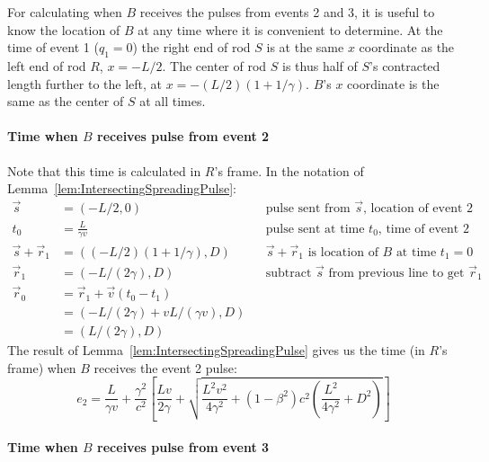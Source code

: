 \documentclass[a4paper]{article}
\theoremstyle{plain}
\theoremstyle{definition}
\newcommand{\vect}[1]{\vec{#1}}
\begin{document}

For calculating when $B$ receives the pulses from events 2 and 3, it
is useful to know the location of $B$ at any time where it is
convenient to determine.  At the time of event 1 ($q_1=0$) the right
end of rod $S$ is at the same $x$ coordinate as the left end of rod
$R$, $x=-L/2$.  The center of rod $S$ is thus half of $S$'s contracted
length further to the left, at $x=-(L/2)(1+1/\gamma)$.  $B$'s $x$
coordinate is the same as the center of $S$ at all times.

\paragraph{Time when $B$ receives pulse from event 2}

Note that this time is calculated in $R$'s frame.
In the notation of Lemma~\ref{lem:IntersectingSpreadingPulse}:
\begin{align*}
\vect{s} & = (-L/2, 0) & & \text{pulse sent from $\vect{s}$, location of event 2} \\
t_0 & = \frac{L}{\gamma v} & & \text{pulse sent at time $t_0$, time of event 2} \\
\vect{s} + \vect{r}_1 & = ((-L/2)(1+1/\gamma), D) & & \text{$\vect{s}+\vect{r}_1$ is location of $B$ at time $t_1=0$} \\
\vect{r}_1 & = (-L/(2 \gamma), D) & & \text{subtract $\vect{s}$ from previous line to get $\vect{r}_1$} \\
\vect{r}_0 & = \vect{r}_1 + \vect{v}(t_0-t_1) \\
           & = (-L/(2 \gamma) + vL/(\gamma v), D) \\
           & = (L/(2 \gamma), D)
\end{align*}
The result of Lemma~\ref{lem:IntersectingSpreadingPulse} gives us the
time (in $R$'s frame) when $B$ receives the event 2 pulse:
\begin{equation}
  e_2 = \frac{L}{\gamma v} +
        \frac{\gamma^2}{c^2} \left[ \frac{Lv}{2 \gamma} + \sqrt{ \frac{L^2v^2}{4 \gamma^2} + (1-\beta^2)c^2 (\frac{L^2}{4 \gamma^2} + D^2) } \right]
\label{eqn:Breceivespulse2}
\end{equation}

\paragraph{Time when $B$ receives pulse from event 3}
\end{document}

